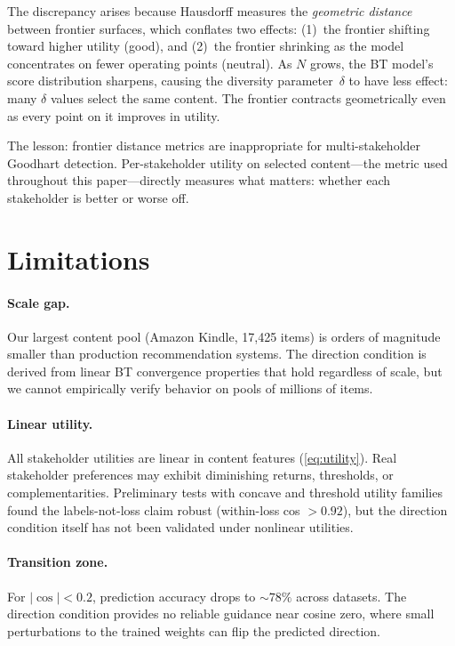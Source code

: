 \documentclass[11pt,letterpaper]{article}
\begin{document}
The discrepancy arises because Hausdorff measures the \emph{geometric
distance} between frontier surfaces, which conflates two effects:
(1)~the frontier shifting toward higher utility (good), and (2)~the
frontier shrinking as the model concentrates on fewer operating points
(neutral). As $N$ grows, the BT model's score distribution sharpens,
causing the diversity parameter~$\delta$ to have less effect: many
$\delta$ values select the same content. The frontier contracts
geometrically even as every point on it improves in utility.

The lesson: frontier distance metrics are inappropriate for
multi-stakeholder Goodhart detection. Per-stakeholder utility on
selected content---the metric used throughout this paper---directly
measures what matters: whether each stakeholder is better or worse off.

\section{Limitations}
\label{sec:limitations}

\paragraph{Scale gap.}
Our largest content pool (Amazon Kindle, 17{,}425 items) is orders of
magnitude smaller than production recommendation systems. The
direction condition is derived from linear BT convergence properties
that hold regardless of scale, but we cannot empirically verify
behavior on pools of millions of items.

\paragraph{Linear utility.}
All stakeholder utilities are linear in content features
(\cref{eq:utility}). Real stakeholder preferences may exhibit
diminishing returns, thresholds, or complementarities. Preliminary
tests with concave and threshold utility families found
the labels-not-loss claim robust (within-loss cos $> 0.92$), but the
direction condition itself has not been validated under nonlinear
utilities.

\paragraph{Transition zone.}
For $|\cos| < 0.2$, prediction accuracy drops to ${\sim}78\%$ across
datasets. The direction condition provides no reliable guidance near
cosine zero, where small perturbations to the trained weights can
flip the predicted direction.
\end{document}

